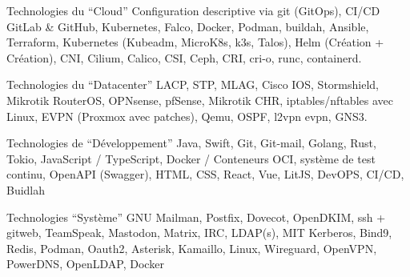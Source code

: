
\begin{cvskills}

  \cvskill
    {Technologies du ``Cloud''}
    {
      Configuration descriptive via git (GitOps), CI/CD GitLab \& GitHub, \break
      Kubernetes, Falco, Docker, Podman, buildah, Ansible, Terraform, Kubernetes \break
      (Kubeadm, MicroK8s, k3s, Talos), Helm (Création + Création), \break 
      CNI, Cilium, Calico, CSI, Ceph, CRI, cri-o, runc, containerd.
    }

    \cvskill
    {Technologies du ``Datacenter''}
    {
      LACP, STP, MLAG, Cisco IOS, Stormshield, Mikrotik RouterOS, OPNsense, \break
      pfSense, Mikrotik CHR, iptables/nftables avec Linux, \break 
      EVPN (Proxmox avec patches), Qemu, OSPF, l2vpn evpn, GNS3.
    }

    \cvskill
    {Technologies de ``Développement''}
    {
      Java, Swift, Git, Git-mail, Golang, Rust, Tokio, JavaScript / TypeScript, \break 
      Docker / Conteneurs OCI, système de test continu, OpenAPI (Swagger), HTML, \break
      CSS, React, Vue, LitJS, DevOPS, CI/CD, Buidlah
    }

    \cvskill
    {Technologies ``Système''}
    {
      GNU Mailman, Postfix, Dovecot, OpenDKIM, ssh + gitweb, TeamSpeak, \break
       Mastodon, Matrix, IRC, LDAP(s), MIT Kerberos, Bind9, Redis, Podman, \break
       Oauth2, Asterisk, Kamaillo, Linux, Wireguard, OpenVPN, PowerDNS, \break
        OpenLDAP, Docker
    }

\end{cvskills}

